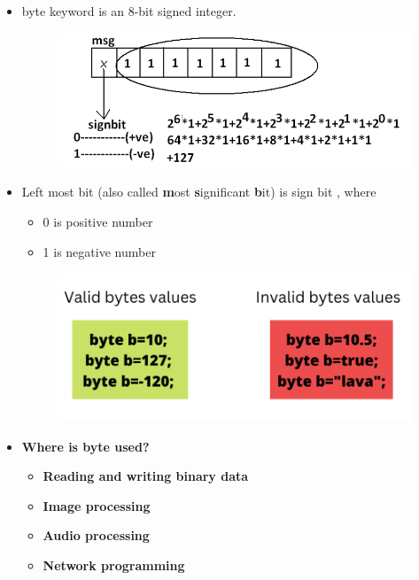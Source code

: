 

\begin{flushleft}

	\begin{itemize}
		\item byte keyword is an 8-bit signed integer. 
		
		
		\begin{figure}[h!]
			\centering
			\includegraphics[scale=.4]{content/chapter2/images/byte.png}
		\end{figure}		
		\item Left most bit (also called \textbf{m}ost \textbf{s}ignificant \textbf{b}it) is sign bit , where 
		\begin{itemize}
			\item 0 is positive number
			\item 1 is negative number
		\end{itemize}
	
		\begin{figure}[h!]
			\centering
			\includegraphics[scale=.45]{content/chapter2/images/byte2.png}
		\end{figure}		
		
	
		\item \textbf{Where is byte used?}
		\begin{itemize}
			\item \textbf{Reading and writing binary data}
			\item \textbf{Image processing}			
			\item \textbf{Audio processing}
			\item \textbf{Network programming}
		\end{itemize}	
	\end{itemize}
	
\end{flushleft}

\newpage

